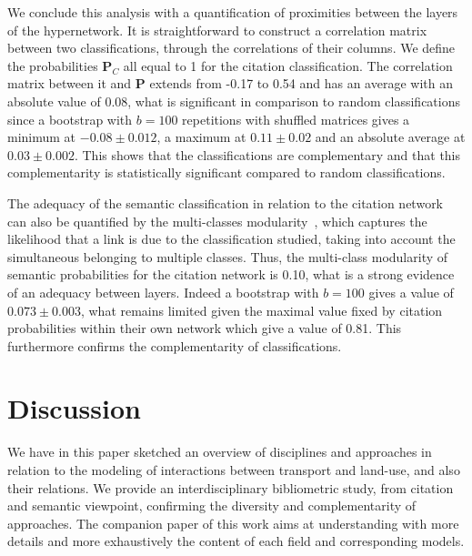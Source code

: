 \documentclass[10pt]{article}
\begin{document}
We conclude this analysis with a quantification of proximities between the layers of the hypernetwork. It is straightforward to construct a correlation matrix between two classifications, through the correlations of their columns. We define the probabilities $\mathbf{P}_C$ all equal to 1 for the citation classification. The correlation matrix between it and $\mathbf{P}$ extends from -0.17 to 0.54 and has an average with an absolute value of 0.08, what is significant in comparison to random classifications since a bootstrap with $b=100$ repetitions with shuffled matrices gives a minimum at $-0.08 \pm 0.012$, a maximum at $0.11 \pm 0.02$ and an absolute average at $0.03 \pm 0.002$. This shows that the classifications are complementary and that this complementarity is statistically significant compared to random classifications.

The adequacy of the semantic classification in relation to the citation network can also be quantified by the multi-classes modularity~\cite{nicosia2009extending}, which captures the likelihood that a link is due to the classification studied, taking into account the simultaneous belonging to multiple classes. Thus, the multi-class modularity of semantic probabilities for the citation network is 0.10, what is a strong evidence of an adequacy between layers. Indeed a bootstrap with $b=100$ gives a value of $0.073 \pm 0.003$, what remains limited given the maximal value fixed by citation probabilities within their own network which give a value of 0.81. This furthermore confirms the complementarity of classifications.







\section{Discussion}



We have in this paper sketched an overview of disciplines and approaches in relation to the modeling of interactions between transport and land-use, and also their relations. We provide an interdisciplinary bibliometric study, from citation and semantic viewpoint, confirming the diversity and complementarity of approaches. The companion paper of this work \cite{raimbault2020systematic} aims at understanding with more details and more exhaustively the content of each field and corresponding models.
\end{document}
